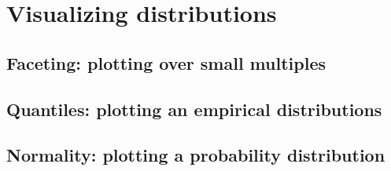 %
%
%
\section{Visualizing distributions}

	\subsection{Faceting: plotting over small multiples}

	\subsection{Quantiles: plotting an empirical distributions}

	\subsection{Normality: plotting a probability distribution}


